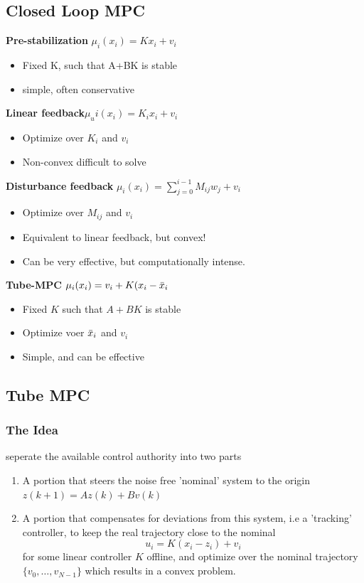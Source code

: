     \subsection{Closed Loop MPC}
    \textbf{Pre-stabilization} $\mu_i(x_i) = Kx_i + v_i$
    \begin{itemize}
        \item Fixed K, such that A+BK is stable
        \item simple, often conservative
    \end{itemize}
    \textbf{Linear feedback}$\mu_ui(x_i) = K_i x_i + v_i$
    \begin{itemize}
        \item Optimize over $K_i$ and $v_i$
        \item Non-convex difficult to solve
    \end{itemize}
    \textbf{Disturbance feedback }$\mu_i(x_i) =\sum^{i-1}_{j=0}M_{ij}w_j+v_i$
    \begin{itemize}
        \item Optimize over $M_{ij}$ and $v_i$
        \item Equivalent to linear feedback, but convex!
        \item Can be very effective, but computationally intense.
    \end{itemize}
    \textbf{Tube-MPC} $\mu_i(x_i) = v_i +K(x_i-\Bar{x}_i$  
        \begin{itemize}
            \item Fixed $ K$ such that $A+BK$ is stable
            \item Optimize voer $\Bar{x}_i$ and $v_i$
            \item Simple, and can be effective
        \end{itemize}
\subsection{Tube MPC}
\subsubsection{The Idea}
seperate the available control authority into two parts
\begin{enumerate}
    \item A portion that steers the noise free 'nominal' system to the origin $z(k+1) = Az(k)+Bv(k)$
    \item A portion that compensates for deviations from this system, i.e a 'tracking' controller, to keep the real trajectory close to the nominal
    \[u_i=K(x_i-z_i)+v_i\]
    for some linear controller $K$ offline, and optimize over the nominal trajectory$\{v_0,\dots,v_{N-1}\}$ which results in a convex problem.
\end{enumerate}
